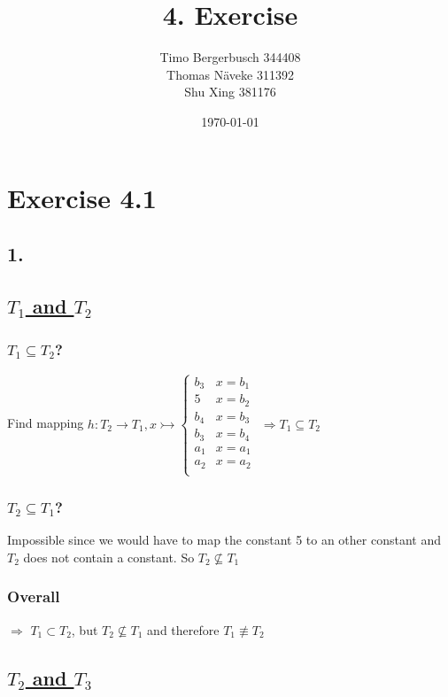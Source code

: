 \documentclass[12pt]{article}
\begin{document}
	
	\title{4. Exercise}
	\author{Timo Bergerbusch 344408 \\ Thomas Näveke 311392 \\ Shu Xing 381176}
	\date{\specialdate\today}
	\maketitle
	
	\section*{Exercise 4.1}
	\subsection*{1.}
	\subsection*{\underline{$T_1$ and $T_2$}}
	\subsubsection*{$T_1 \subseteq T_2$?}
	Find mapping $h: T_2 \rightarrow T_1, x \rightarrowtail 
		\begin{cases}
			b_3 & x=b_1 \\
			5 & x=b_2 \\
			b_4 & x=b_3 \\
			b_3 & x=b_4 \\
			a_1 & x=a_1 \\
			a_2 & x=a_2 \\
		\end{cases}$
		$\Rightarrow T_1 \subseteq T_2$
	\subsubsection*{$T_2 \subseteq T_1$?}
	Impossible since we would have to map the constant 5 to an other constant and $T_2$ does not contain a constant. So $T_2 \not \subseteq T_1$
	\subsubsection*{Overall}
	$\Rightarrow$ $T_1 \subset T_2$, but $T_2 \not\subseteq T_1$ and therefore $T_1 \not\equiv T_2$
	
	\subsection*{\underline{$T_2$ and $T_3$}}
\end{document}
